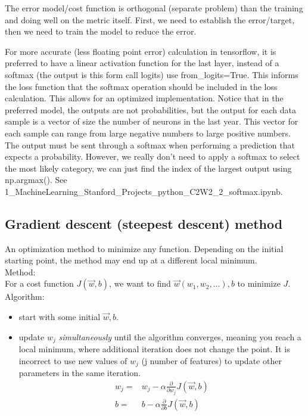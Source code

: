 \documentclass[12pt]{report}
\begin{document}
The error model/cost function is orthogonal (separate problem) than the training and doing well on the metric itself. First, we need to establish the error/target, then we need to train the model to reduce the error.

For more accurate (less floating point error) calculation in tensorflow, it is preferred to have a linear activation function for the last layer, instead of a softmax (the output is this form call logits) use from\_logits=True. This informs the loss function that the softmax operation should be included in the loss calculation. This allows for an optimized implementation. Notice that in the preferred model, the outputs are not probabilities, but the output for each data sample is a vector of size the number of neurons in the last year. This vector for each sample can range from large negative numbers to large positive numbers. The output must be sent through a softmax when performing a prediction that expects a probability. However, we really don't need to apply a softmax to select the most likely category, we can just find the index of the largest output using np.argmax(). See 1\_MachineLearning\_Stanford\_Projects\_python\_C2W2\_2\_softmax.ipynb.



\subsection{Gradient descent (steepest descent) method}
\label{sec:gradient}

An optimization method to minimize any function. Depending on the initial starting point, the method may end up at a different local minimum. \\

Method: \\
For a cost function $J(\overrightarrow{w},b)$,  we want to find  $ \overrightarrow{w} (w_1, w_2, ...) , b$ to minimize $J$.\\

Algorithm: \\
\begin{itemize}
\item start with some initial $\overrightarrow{w}, b$.
\item update $w_j$ \textit{simultaneously} until the algorithm converges, meaning you reach a local minimum, where additional iteration does not change the point. It is incorrect to use new values of $w_j$  (j number of features) to update other parameters in the same iteration.
\begin{equation}
\begin{split}
  w_j =& w_j - \alpha \frac{\partial}{\partial w_j} J(\overrightarrow{w},b) \\
  b =& b - \alpha \frac{\partial  }{\partial b} J(\overrightarrow{w},b) \\
\end{split}
\end{equation}
\end{itemize}
\end{document}
